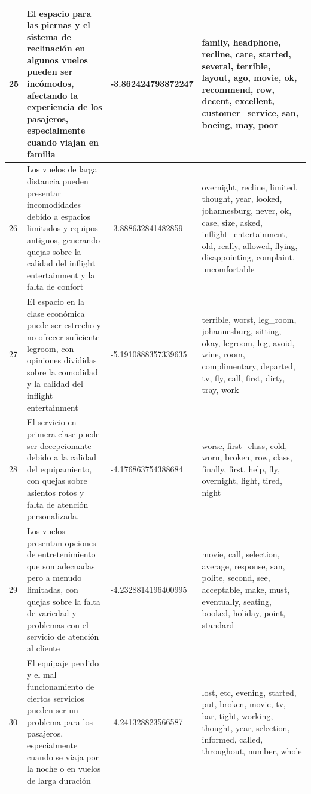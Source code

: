 \documentclass{report}
\begin{document}
{{\begin{longtable}{|p{1cm}|p{4cm}|p{4cm}|p{6cm}|}
                    \hline
                    25 & El espacio para las piernas y el sistema de reclinación en algunos vuelos pueden ser incómodos, afectando la experiencia de los pasajeros, especialmente cuando viajan en familia & -3.862424793872247 & family, headphone, recline, care, started, several, terrible, layout, ago, movie, ok, recommend, row, decent, excellent, customer\_service, san, boeing, may, poor \\
                    \hline
                    26 & Los vuelos de larga distancia pueden presentar incomodidades debido a espacios limitados y equipos antiguos, generando quejas sobre la calidad del inflight entertainment y la falta de confort & -3.888632841482859 & overnight, recline, limited, thought, year, looked, johannesburg, never, ok, case, size, asked, inflight\_entertainment, old, really, allowed, flying, disappointing, complaint, uncomfortable \\
                    \hline
                    27 & El espacio en la clase económica puede ser estrecho y no ofrecer suficiente legroom, con opiniones divididas sobre la comodidad y la calidad del inflight entertainment & -5.1910888357339635 & terrible, worst, leg\_room, johannesburg, sitting, okay, legroom, leg, avoid, wine, room, complimentary, departed, tv, fly, call, first, dirty, tray, work \\
                    \hline
                    28 & El servicio en primera clase puede ser decepcionante debido a la calidad del equipamiento, con quejas sobre asientos rotos y falta de atención personalizada. & -4.176863754388684 & worse, first\_class, cold, worn, broken, row, class, finally, first, help, fly, overnight, light, tired, night \\
                    \hline
                    29 & Los vuelos presentan opciones de entretenimiento que son adecuadas pero a menudo limitadas, con quejas sobre la falta de variedad y problemas con el servicio de atención al cliente & -4.2328814196400995 & movie, call, selection, average, response, san, polite, second, see, acceptable, make, must, eventually, seating, booked, holiday, point, standard \\
                    \hline
                    30 & El equipaje perdido y el mal funcionamiento de ciertos servicios pueden ser un problema para los pasajeros, especialmente cuando se viaja por la noche o en vuelos de larga duración & -4.241328823566587 & lost, etc, evening, started, put, broken, movie, tv, bar, tight, working, thought, year, selection, informed, called, throughout, number, whole \\

\end{longtable}}}
\end{document}
